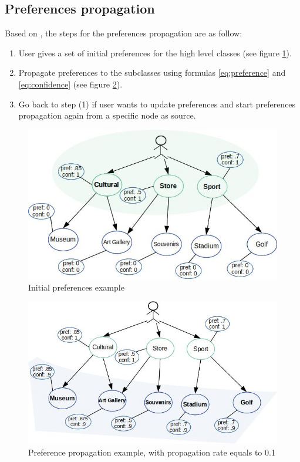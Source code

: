 \subsection{Preferences propagation} \label{section:preferences-propagation}
Based on \cite{bahramian_abbaspour_claramunt_2017}, the steps for the preferences propagation are as follow:
\begin{enumerate}
    \item User gives a set of initial preferences for the high level classes (see figure \ref{fig:initial_pref}).
    
    \item Propagate preferences to the subclasses using formulas \ref{eq:preference} and \ref{eq:confidence} (see figure \ref{fig:pref_prop}).
    
    \item Go back to step (1) if user wants to update preferences and start preferences propagation again from a specific node as source.
\end{enumerate}

\begin{figure}[h]
\centering
\includegraphics[scale=0.5]{draws/initial_pref.jpg}
\caption{Initial preferences example}
\label{fig:initial_pref}
\end{figure}

\begin{figure}[h]
\centering
\includegraphics[scale=0.5]{draws/pref_spred.jpg}
\caption{Preference propagation example, with propagation rate equals to 0.1}
\label{fig:pref_prop}
\end{figure}

